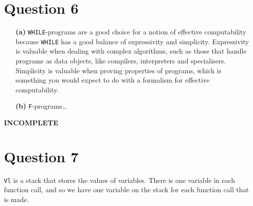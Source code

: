 \documentclass{article}
\begin{document}
\section*{Question 6}
\begin{enumerate}
    \item[\textbf{(a)}] \texttt{WHILE}-programs are a good choice for a notion of effective computability because \texttt{WHILE} has a good balance of expressivity and simplicity. Expressivity is valuable when dealing with complex algorithms, such as those that handle programs as data objects, like compilers, interpreters and specialisers. Simplicity is valuable when proving properties of programs, which is something you would expect to do with a formalism for effective computability.
    \item[\textbf{(b)}] \texttt{F}-programs\dots
\end{enumerate}

\textbf{INCOMPLETE}

\section*{Question 7}
\texttt{Vl} is a stack that stores the values of variables. There is one variable in each function call, and so we have one variable on the stack for each function call that is made.
\end{document}
